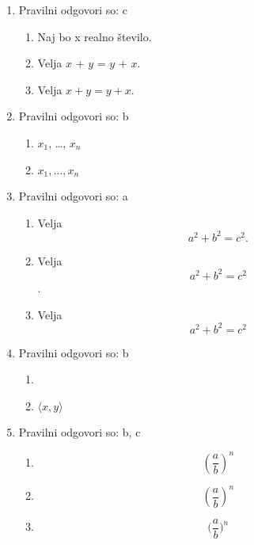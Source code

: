 \documentclass[11pt]{article}
\begin{document}
\begin{enumerate}
    \item Pravilni odgovori so: c %
    \begin{enumerate}
        \item Naj bo x realno število.
        \item Velja \(x\) + \(y\) = \(y\) + \(x\).
        \item Velja \(x + y = y + x\).
    \end{enumerate}

    \item Pravilni odgovori so: b %
    \begin{enumerate}
        \item \(x_1\), \dots, \(x_n\)
        \item \(x_1, \ldots, x_n\)
    \end{enumerate}

    \item Pravilni odgovori so: a %
    \begin{enumerate}
        \item
Velja
\[
  a^2 + b^2 = c^2.
\]
        \item
Velja
\[
  a^2 + b^2 = c^2
\]
.
        \item
Velja
\[
  a^2 + b^2 = c^2
\]
    \end{enumerate}

    \item Pravilni odgovori so: b %
    \begin{enumerate}
        \item \(<x, y>\)
        \item \(\langle x, y \rangle\)
    \end{enumerate}

    \item Pravilni odgovori so: b, c %
    \begin{enumerate}
        \item \[ (\frac{a}{b})^n \]
        \item \[ \left(\frac{a}{b}\right)^n \]
        \item \[ \Big(\frac{a}{b}\Big)^n \]
    \end{enumerate}


\end{enumerate}
\end{document}
